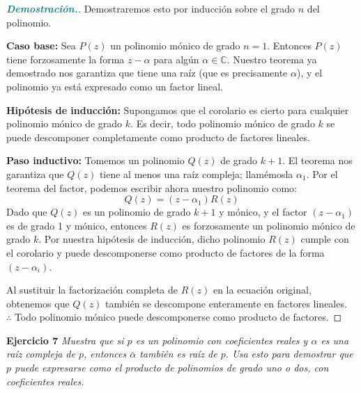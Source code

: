 \documentclass[12pt, letterpaper]{article}
\begin{document}
\begin{proof}[\textbf{\textcolor{teal}{Demostración.}}]
    Demostraremos esto por inducción sobre el grado $n$ del polinomio.
    
    \textbf{Caso base:} Sea $P(z)$ un polinomio mónico de grado $n=1$. Entonces $P(z)$ tiene forzosamente la forma $z - \alpha$ para algún $\alpha \in \mathbb{C}$. Nuestro teorema ya demostrado nos garantiza que tiene una raíz (que es precisamente $\alpha$), y el polinomio ya está expresado como un factor lineal.
    
    \textbf{Hipótesis de inducción:} Supongamos que el corolario es cierto para cualquier polinomio mónico de grado $k$. Es decir, todo polinomio mónico de grado $k$ se puede descomponer completamente como producto de factores lineales.
    
    \textbf{Paso inductivo:} Tomemos un polinomio $Q(z)$ de grado $k+1$. El teorema nos garantiza que $Q(z)$ tiene al menos una raíz compleja; llamémosla $\alpha_1$.
    Por el teorema del factor, podemos escribir ahora nuestro polinomio como:
    \[ Q(z) = (z - \alpha_1)R(z) \]
    Dado que $Q(z)$ es un polinomio de grado $k+1$ y mónico, y el factor $(z-\alpha_1)$ es de grado 1 y mónico, entonces $R(z)$ es forzosamente un polinomio mónico de grado $k$. 
    Por nuestra hipótesis de inducción, dicho polinomio $R(z)$ cumple con el corolario y puede descomponerse como producto de factores de la forma $(z-\alpha_i)$.
    
    Al sustituir la factorización completa de $R(z)$ en la ecuación original, obtenemos que $Q(z)$ también se descompone enteramente en factores lineales.\\
    
    $\therefore$ Todo polinomio mónico puede descomponerse como producto de factores.
\end{proof}

\vspace{0.4cm}
\noindent \textbf{Ejercicio 7} \textit{Muestra que si $p$ es un polinomio con coeficientes reales y $\alpha$ es una raíz compleja de $p$, entonces $\bar{\alpha}$ también es raíz de $p$. Usa esto para demostrar que $p$ puede expresarse como el producto de polinomios de grado uno o dos, con coeficientes reales.}
\end{document}

